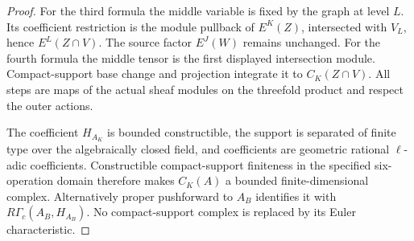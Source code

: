 \documentclass[11pt]{article}
\theoremstyle{definition}
\theoremstyle{remark}
\begin{document}
\begin{proof}
For the third formula the middle variable is fixed by the graph at
level $L$.  Its coefficient restriction is the module pullback of
$E^K(Z)$, intersected with $V_L$, hence $E^L(Z\cap V)$.
The source factor $E^J(W)$ remains unchanged.  For the fourth formula
the middle tensor is the first displayed intersection module.
Compact-support base change and projection integrate it to $C_K(Z\cap V)$.
All steps are maps of the actual sheaf modules on the threefold
product and respect the outer actions.

The coefficient $H_{A_K}$ is bounded constructible, the support is
separated of finite type over the algebraically closed field, and
coefficients are geometric rational $\ell$-adic coefficients.
Constructible compact-support finiteness in the specified six-operation
domain therefore makes $C_K(A)$ a bounded finite-dimensional complex.
Alternatively proper pushforward to $A_B$ identifies it with
$R\Gamma_c(A_B,H_{A_B})$.  No compact-support complex is replaced by
its Euler characteristic.
\end{proof}
\end{document}

